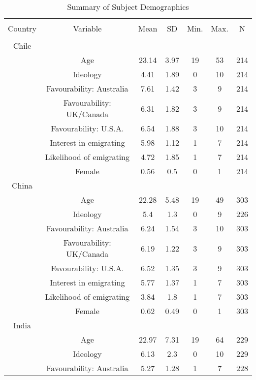 
\begin{table}[!htbp] \centering 
  \caption{Summary of Subject Demographics} 
  \label{tab:subjects} 
\begin{tabular}{@{\extracolsep{5pt}} ccccccc} 
\\[-1.8ex]\hline 
\hline \\[-1.8ex] 
Country & Variable & Mean & SD & Min. & Max. & N \\ 
\hline \\[-1.8ex] 
Chile &  &  &  &  &  &  \\ 
 & Age & 23.14 & 3.97 & 19 & 53 & 214 \\ 
 & Ideology & 4.41 & 1.89 & 0 & 10 & 214 \\ 
 & Favourability: Australia & 7.61 & 1.42 & 3 & 9 & 214 \\ 
 & Favourability: UK/Canada & 6.31 & 1.82 & 3 & 9 & 214 \\ 
 & Favourability: U.S.A. & 6.54 & 1.88 & 3 & 10 & 214 \\ 
 & Interest in emigrating & 5.98 & 1.12 & 1 & 7 & 214 \\ 
 & Likelihood of emigrating & 4.72 & 1.85 & 1 & 7 & 214 \\ 
 & Female & 0.56 & 0.5 & 0 & 1 & 214 \\ 
China &  &  &  &  &  &  \\ 
 & Age & 22.28 & 5.48 & 19 & 49 & 303 \\ 
 & Ideology & 5.4 & 1.3 & 0 & 9 & 226 \\ 
 & Favourability: Australia & 6.24 & 1.54 & 3 & 10 & 303 \\ 
 & Favourability: UK/Canada & 6.19 & 1.22 & 3 & 9 & 303 \\ 
 & Favourability: U.S.A. & 6.52 & 1.35 & 3 & 9 & 303 \\ 
 & Interest in emigrating & 5.77 & 1.37 & 1 & 7 & 303 \\ 
 & Likelihood of emigrating & 3.84 & 1.8 & 1 & 7 & 303 \\ 
 & Female & 0.62 & 0.49 & 0 & 1 & 303 \\ 
India &  &  &  &  &  &  \\ 
 & Age & 22.97 & 7.31 & 19 & 64 & 229 \\ 
 & Ideology & 6.13 & 2.3 & 0 & 10 & 229 \\ 
 & Favourability: Australia & 5.27 & 1.28 & 1 & 7 & 228 \\ 

\end{tabular}
\end{table}
